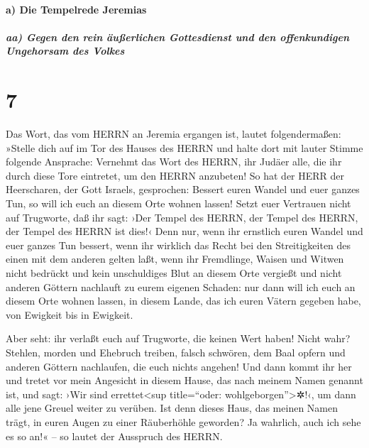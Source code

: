 \hypertarget{a-die-tempelrede-jeremias}{%
\paragraph{a) Die Tempelrede Jeremias}\label{a-die-tempelrede-jeremias}}

\hypertarget{aa-gegen-den-rein-uxe4uuxdferlichen-gottesdienst-und-den-offenkundigen-ungehorsam-des-volkes}{%
\subparagraph{aa) Gegen den rein äußerlichen Gottesdienst und den
offenkundigen Ungehorsam des
Volkes}\label{aa-gegen-den-rein-uxe4uuxdferlichen-gottesdienst-und-den-offenkundigen-ungehorsam-des-volkes}}

\hypertarget{section-6}{%
\section{7}\label{section-6}}

Das Wort, das vom HERRN an Jeremia ergangen ist, lautet
folgendermaßen: »Stelle dich auf im Tor des Hauses des
HERRN und halte dort mit lauter Stimme folgende Ansprache: Vernehmt das
Wort des HERRN, ihr Judäer alle, die ihr durch diese Tore eintretet, um
den HERRN anzubeten! So hat der HERR der Heerscharen, der
Gott Israels, gesprochen: Bessert euren Wandel und euer ganzes Tun, so
will ich euch an diesem Orte wohnen lassen! Setzt euer
Vertrauen nicht auf Trugworte, daß ihr sagt: ›Der Tempel des HERRN, der
Tempel des HERRN, der Tempel des HERRN ist dies!‹ Denn
nur, wenn ihr ernstlich euren Wandel und euer ganzes Tun bessert, wenn
ihr wirklich das Recht bei den Streitigkeiten des einen mit dem anderen
gelten laßt, wenn ihr Fremdlinge, Waisen und Witwen nicht
bedrückt und kein unschuldiges Blut an diesem Orte vergießt und nicht
anderen Göttern nachlauft zu eurem eigenen Schaden: nur
dann will ich euch an diesem Orte wohnen lassen, in diesem Lande, das
ich euren Vätern gegeben habe, von Ewigkeit bis in Ewigkeit.

Aber seht: ihr verlaßt euch auf Trugworte, die keinen Wert
haben! Nicht wahr? Stehlen, morden und Ehebruch treiben,
falsch schwören, dem Baal opfern und anderen Göttern nachlaufen, die
euch nichts angehen! Und dann kommt ihr her und tretet
vor mein Angesicht in diesem Hause, das nach meinem Namen genannt ist,
und sagt: ›Wir sind errettet\textless sup title=``oder:
wohlgeborgen''\textgreater✲!‹, um dann alle jene Greuel weiter zu
verüben. Ist denn dieses Haus, das meinen Namen trägt, in
euren Augen zu einer Räuberhöhle geworden? Ja wahrlich, auch ich sehe es
so an!« -- so lautet der Ausspruch des HERRN.

